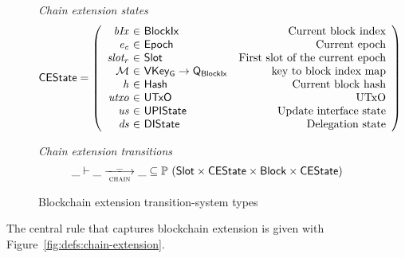 \documentclass[11pt,a4paper]{article}
\newcommand{\powerset}[1]{\mathbb{P}~#1}
\newcommand{\var}[1]{\mathit{#1}}
\newcommand{\type}[1]{\mathsf{#1}}
\newcommand{\trans}[2]{\xlongrightarrow[\textsc{#1}]{#2}}
\newcommand{\totalf}{\to}
\newcommand{\Hash}{\type{Hash}}  %
\newcommand{\Slot}{\type{Slot}}
\newcommand{\BlockIx}{\type{BlockIx}}
\newcommand{\Block}{\type{Block}}
\newcommand{\Queue}{\type{Q}}
\newcommand{\VKeyGen}{\type{VKey_G}}
\newcommand{\signmapname}{\mathcal{M}}
\begin{document}
\begin{figure}[ht]
  \emph{Chain extension states}
  \begin{equation*}
    \CEState =
    \left(
      \begin{array}{r@{~\in~}lr}
        \var{bIx} & \BlockIx & \text{Current block index} \\
        \var{e_c} & \Epoch & \text{Current epoch} \\
        \var{slot_r} & \Slot & \text{First slot of the current epoch} \\
        \signmapname & \VKeyGen \totalf \Queue_\BlockIx & \text{key to block index map} \\
        \var{h} & \Hash & \text{Current block hash} \\
        \var{utxo} & \UTxO & \text{UTxO} \\
        \var{us} & \UPIState & \text{Update interface state} \\
        \var{ds} & \DIState & \text{Delegation state}
      \end{array}
    \right)
  \end{equation*}

  \emph{Chain extension transitions}
  \begin{equation*}
    \_ \vdash \var{\_} \trans{chain}{\_} \var{\_} \subseteq
    \powerset (\Slot \times \CEState \times \Block \times \CEState)
  \end{equation*}

  \caption{Blockchain extension transition-system types}
  \label{fig:ts-types:chain-extension}
\end{figure}

The central rule that captures blockchain extension is given with
Figure~\ref{fig:defs:chain-extension}.
\end{document}
